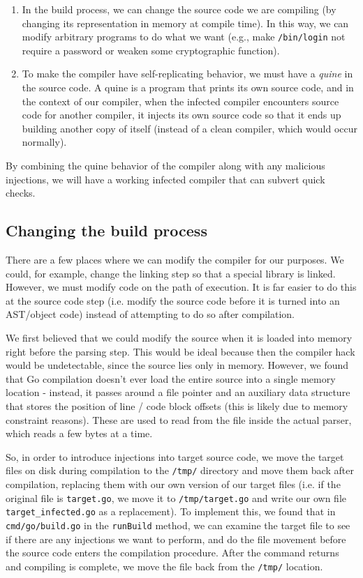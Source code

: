 \documentclass[10pt]{sigplanconf}
\begin{document}
\begin{enumerate}
\item In the build process, we can change the source code we are compiling (by changing its representation in memory at compile time). In this way, we can modify arbitrary programs to do what we want (e.g., make \texttt{/bin/login} not require a password or weaken some cryptographic function).
\item To make the compiler have self-replicating behavior, we must have a \emph{quine} in the source code. A quine is a program that prints its own source code, and in the context of our compiler, when the infected compiler encounters source code for another compiler, it injects its own source code so that it ends up building another copy of itself (instead of a clean compiler, which would occur normally).
\end{enumerate}

By combining the quine behavior of the compiler along with any malicious injections, we will have a working infected compiler that can subvert quick checks.

\subsection{Changing the build process}
There are a few places where we can modify the compiler for our purposes. We could, for example, change the linking step so that a special library is linked. However, we must modify code on the path of execution. It is far easier to do this at the source code step (i.e. modify the source code before it is turned into an AST/object code) instead of attempting to do so after compilation. 

\smallskip

We first believed that we could modify the source when it is loaded into memory right before the parsing step. This would be ideal because then the compiler hack would be undetectable, since the source lies only in memory. However, we found that Go compilation doesn't ever load the entire source into a single memory location - instead, it passes around a file pointer and an auxiliary data structure that stores the position of line / code block offsets (this is likely due to memory constraint reasons). These are used to read from the file inside the actual parser, which reads a few bytes at a time.

\smallskip

So, in order to introduce injections into target source code, we move the target files on disk during compilation to the \texttt{/tmp/} directory and move them back after compilation, replacing them with our own version of our target files (i.e. if the original file is \texttt{target.go}, we move it to \texttt{/tmp/target.go} and write our own file \texttt{target\_infected.go} as a replacement). To implement this, we found that in \texttt{cmd/go/build.go} in the \texttt{runBuild} method, we can examine the target file to see if there are any injections we want to perform, and do the file movement before the source code enters the compilation procedure. After the command returns and compiling is complete, we move the file back from the \texttt{/tmp/} location.
\end{document}
